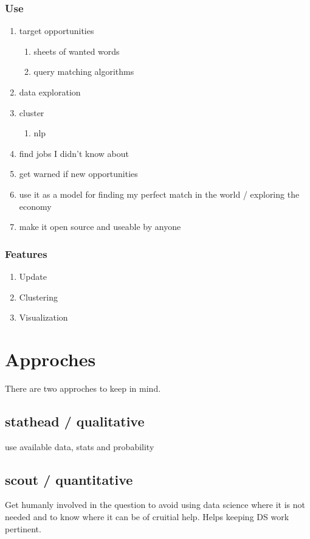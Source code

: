 \documentclass[11pt]{article}
\begin{document}
\subsubsection{Use}
\label{sec:org36b6a30}
\begin{enumerate}
\item target opportunities
\label{sec:orga72ebed}
\begin{enumerate}
\item sheets of wanted words
\label{sec:orgc22ffa4}
\item query matching algorithms
\label{sec:org212049c}
\end{enumerate}
\item data exploration
\label{sec:orgf2837db}
\item cluster
\label{sec:orgd1664b4}
\begin{enumerate}
\item nlp
\label{sec:orgd9386eb}
\end{enumerate}
\item find jobs I didn't know about
\label{sec:org33e2dfe}
\item get warned if new opportunities
\label{sec:orgdc85682}
\item use it as a model for finding my perfect match in the world / exploring the economy
\label{sec:orgbc2521f}
\item make it open source and useable by anyone
\label{sec:orgd404bfa}
\end{enumerate}
\subsubsection{Features}
\label{sec:org24cc0e5}
\begin{enumerate}
\item Update
\label{sec:orgaf354bb}
\item Clustering
\label{sec:orgdae5145}
\item Visualization
\label{sec:orgd9dd2a4}
\end{enumerate}
\section{Approches}
\label{sec:org6f6e7b2}
There are two approches to keep in mind.
\subsection{stathead / qualitative}
\label{sec:org7ed8580}
use available data, stats and probability
\subsection{scout / quantitative}
\label{sec:org159eb68}
Get humanly involved in the question to avoid using data science where it is not needed and to know where it can be of cruitial help. Helps keeping DS work pertinent.
\end{document}
